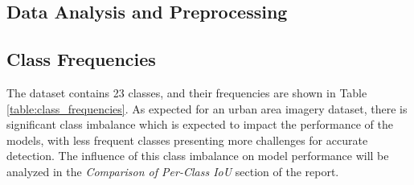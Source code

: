 \documentclass[a4paper]{article}
\begin{document}
\subsection{Data Analysis and Preprocessing}
\subsection{Class Frequencies}
The dataset contains 23 classes, and their frequencies are shown in Table \ref{table:class_frequencies}. As expected for an urban area imagery dataset, there is significant class imbalance which is expected to impact the performance of the models, with less frequent classes presenting more challenges for accurate detection. The influence of this class imbalance on model performance will be analyzed in the \textit{Comparison of Per-Class IoU} section of the report.
\end{document}
